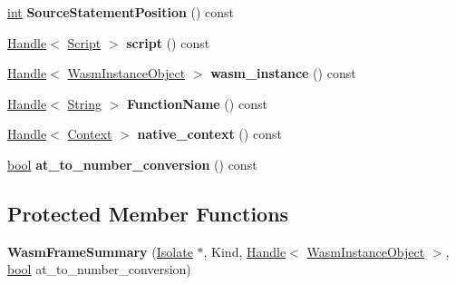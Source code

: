 \begin{DoxyCompactItemize}
\mbox{\hyperlink{classint}{int}} {\bfseries Source\+Statement\+Position} () const
\item 
\mbox{\label{classv8_1_1internal_1_1FrameSummary_1_1WasmFrameSummary_ae04d805a5e55075b7dc5079fe3bdc485}} 
\mbox{\hyperlink{classv8_1_1internal_1_1Handle}{Handle}}$<$ \mbox{\hyperlink{classv8_1_1internal_1_1Script}{Script}} $>$ {\bfseries script} () const
\item 
\mbox{\label{classv8_1_1internal_1_1FrameSummary_1_1WasmFrameSummary_ac2b0a456a4d9555bbf0b2962eb543826}} 
\mbox{\hyperlink{classv8_1_1internal_1_1Handle}{Handle}}$<$ \mbox{\hyperlink{classv8_1_1internal_1_1WasmInstanceObject}{Wasm\+Instance\+Object}} $>$ {\bfseries wasm\+\_\+instance} () const
\item 
\mbox{\label{classv8_1_1internal_1_1FrameSummary_1_1WasmFrameSummary_aebb3dfed686e1cdbcceba9a8b4476717}} 
\mbox{\hyperlink{classv8_1_1internal_1_1Handle}{Handle}}$<$ \mbox{\hyperlink{classv8_1_1internal_1_1String}{String}} $>$ {\bfseries Function\+Name} () const
\item 
\mbox{\label{classv8_1_1internal_1_1FrameSummary_1_1WasmFrameSummary_ab8325919a42dc82509fb90e9a95bba1a}} 
\mbox{\hyperlink{classv8_1_1internal_1_1Handle}{Handle}}$<$ \mbox{\hyperlink{classv8_1_1internal_1_1Context}{Context}} $>$ {\bfseries native\+\_\+context} () const
\item 
\mbox{\label{classv8_1_1internal_1_1FrameSummary_1_1WasmFrameSummary_a49d5a11ee48a0a87b47c1cb05bc3fb26}} 
\mbox{\hyperlink{classbool}{bool}} {\bfseries at\+\_\+to\+\_\+number\+\_\+conversion} () const
\end{DoxyCompactItemize}
\subsection*{Protected Member Functions}
\begin{DoxyCompactItemize}
\item 
\mbox{\label{classv8_1_1internal_1_1FrameSummary_1_1WasmFrameSummary_a1b45a9d5bc4ca982e5e414d2eac4542b}} 
{\bfseries Wasm\+Frame\+Summary} (\mbox{\hyperlink{classv8_1_1internal_1_1Isolate}{Isolate}} $\ast$, Kind, \mbox{\hyperlink{classv8_1_1internal_1_1Handle}{Handle}}$<$ \mbox{\hyperlink{classv8_1_1internal_1_1WasmInstanceObject}{Wasm\+Instance\+Object}} $>$, \mbox{\hyperlink{classbool}{bool}} at\+\_\+to\+\_\+number\+\_\+conversion)
\end{DoxyCompactItemize}


